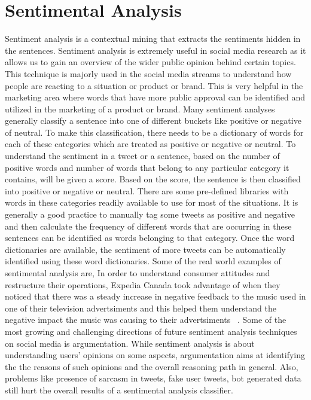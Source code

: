 \section{Sentimental Analysis}
Sentiment analysis is a contextual mining that extracts the sentiments hidden in 
the sentences. Sentiment analysis is extremely useful in social media research as 
it allows us to gain an overview of the wider public opinion behind certain topics.
This technique is majorly used in the social media streams to understand how people 
are reacting to a situation or product or brand. This is very helpful in the 
marketing area where words that have more public approval 
can be identified and utilized in the marketing of a product or brand. Many 
sentiment analyses generally classify a sentence into one of different buckets 
like positive or negative of neutral. To make this classification, there needs 
to be a dictionary of words for each of these categories which are treated as 
positive or negative or neutral. To understand the sentiment in a tweet or a 
sentence, based on the number of positive words and number of words that belong 
to any particular category it contains, will be given a score. Based on the 
score, the sentence is then classified into positive or negative or neutral. 
There are some pre-defined libraries with words in these categories readily 
available to use for most of the situations. It is generally a good practice to 
manually tag some tweets as positive and negative and then calculate the 
frequency of different words that are occurring in these sentences can be 
identified as words belonging to that category. Once the word dictionaries are 
available, the sentiment of more tweets can be automatically identified using 
these word dictionaries. Some of the real world examples of sentimental analysis are,
In order to understand consumer attitudes and restructure their operations, Expedia Canada 
took advantage of when they noticed that there was a steady increase in negative feedback 
to the music used in one of their television advertsiments and this helped them understand 
the negative impact the music was causing to their advertsiments ~\cite{hid-sp18-418-sentimental-analysis-application}. 
Some of the most growing and challenging directions of future sentiment analysis techniques on social 
media is argumentation. While sentiment analysis is about understanding users' opinions 
on some aspects, argumentation aims at identifying the the reasons of such opinions 
and the overall reasoning path in general. Also, problems like presence of sarcasm 
in tweets, fake user tweets, bot generated data still hurt the overall results of 
a sentimental analysis classifier. 


